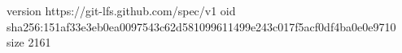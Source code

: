 version https://git-lfs.github.com/spec/v1
oid sha256:151af33e3eb0ea0097543c62d581099611499e243c017f5acf0df4ba0e0e9710
size 2161
